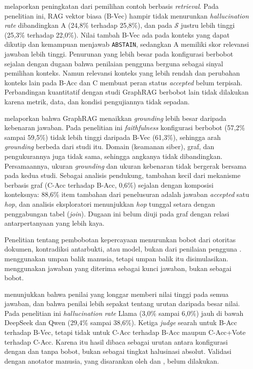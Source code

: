 \textcite{Nashid2023} melaporkan peningkatan dari pemilihan contoh berbasis \emph{retrieval}. Pada penelitian ini, RAG vektor biasa (B-Vec) hampir tidak menurunkan \emph{hallucination rate} dibandingkan A (24,8\% terhadap 25,8\%), dan pada $\mathcal{S}$ justru lebih tinggi (25,3\% terhadap 22,0\%). Nilai tambah B-Vec ada pada konteks yang dapat dikutip dan kemampuan menjawab \texttt{ABSTAIN}, sedangkan A memiliki skor relevansi jawaban lebih tinggi. Penurunan yang lebih besar pada konfigurasi berbobot sejalan dengan dugaan bahwa penilaian pengguna berguna sebagai sinyal pemilihan konteks. Namun relevansi konteks yang lebih rendah dan perubahan konteks lain pada B-Acc dan C membuat peran status \emph{accepted} belum terpisah. Perbandingan kuantitatif dengan studi GraphRAG berbobot lain tidak dilakukan karena metrik, data, dan kondisi pengujiannya tidak sepadan.

\textcite{Pandilova2026} melaporkan bahwa GraphRAG menaikkan \emph{grounding} lebih besar daripada kebenaran jawaban. Pada penelitian ini \emph{faithfulness} konfigurasi berbobot (57,2\% sampai 59,5\%) tidak lebih tinggi daripada B-Vec (61,3\%), sehingga arah \emph{grounding} berbeda dari studi itu. Domain (keamanan siber), graf, dan pengukurannya juga tidak sama, sehingga angkanya tidak dibandingkan. Persamaannya, ukuran \emph{grounding} dan ukuran kebenaran tidak bergerak bersama pada kedua studi. Sebagai analisis pendukung, tambahan kecil dari mekanisme berbasis graf (C-Acc terhadap B-Acc, 0,6\%) sejalan dengan komposisi konteksnya: 88,6\% item tambahan dari penelusuran adalah jawaban \emph{accepted} satu \emph{hop}, dan analisis eksploratori menunjukkan \emph{hop} tunggal setara dengan penggabungan tabel (\emph{join}). Dugaan ini belum diuji pada graf dengan relasi antarpertanyaan yang lebih kaya.

Penelitian tentang pembobotan kepercayaan menurunkan bobot dari otoritas dokumen, kontradiksi antarbukti, atau model, bukan dari penilaian pengguna \autocite{Yu2026DoG, Shi2026, Asghari2026}. \textcite{LiTrustProp2026} menggunakan umpan balik manusia, tetapi umpan balik itu disimulasikan. \textcite{Banerjee2024} menggunakan jawaban yang diterima sebagai kunci jawaban, bukan sebagai bobot.

\textcite{Solca2026} menunjukkan bahwa penilai yang longgar memberi nilai tinggi pada semua jawaban, dan bahwa penilai lebih sepakat tentang urutan daripada besar nilai. Pada penelitian ini \emph{hallucination rate} Llama (3,0\% sampai 6,0\%) jauh di bawah DeepSeek dan Qwen (29,4\% sampai 38,6\%). Ketiga \emph{judge} searah untuk B-Acc terhadap B-Vec, tetapi tidak untuk C-Acc terhadap B-Acc maupun C-Acc+Vote terhadap C-Acc. Karena itu hasil dibaca sebagai urutan antara konfigurasi dengan dan tanpa bobot, bukan sebagai tingkat halusinasi absolut. Validasi dengan anotator manusia, yang disarankan oleh \textcite{Gu2026} dan \textcite{Thakur2025}, belum dilakukan.

